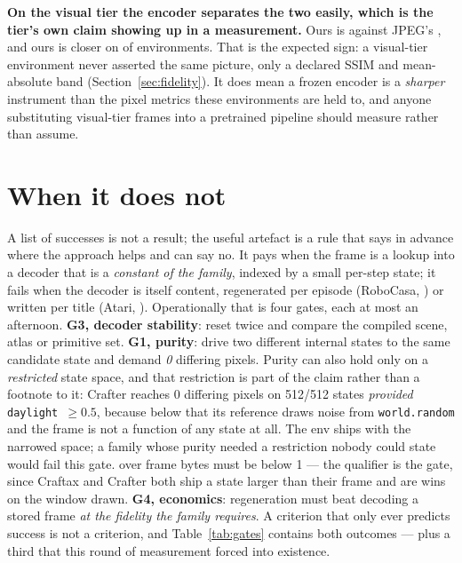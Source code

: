 \documentclass{article}
\begin{document}
\textbf{On the visual tier the encoder separates the two easily, which is the
tier's own claim showing up in a measurement.} Ours is \seDinoVisualOurs{}
against JPEG's \seDinoVisualJpeg{}, and ours is closer on
\seDinoVisualCloser{} of \seDinoVisualN{} environments. That is the expected
sign: a visual-tier environment never asserted the same picture, only a
declared SSIM and mean-absolute band (Section~\ref{sec:fidelity}). It does mean
a frozen encoder is a \emph{sharper} instrument than the pixel metrics these
environments are held to, and anyone substituting visual-tier frames into a
pretrained pipeline should measure rather than assume.


\section{When it does not}
\label{sec:nogo}

A list of successes is not a result; the useful artefact is a rule that says in
advance where the approach helps and can say no. It pays when the frame is a
lookup into a decoder that is a \emph{constant of the family}, indexed by a
small per-step state; it fails when the decoder is itself content, regenerated
per episode (RoboCasa, \citealt{robocasa}) or written per title (Atari,
\citealt{ale}). Operationally that is four gates, each at most an afternoon. \textbf{G3, decoder stability}: reset twice and compare the compiled
scene, atlas or primitive set. \textbf{G1, purity}: drive two different
internal states to the same candidate state and demand \emph{0} differing
pixels. Purity can also hold only on a \emph{restricted} state space, and that
restriction is part of the claim rather than a footnote to it: Crafter reaches 0
differing pixels on 512/512 states \emph{provided} \texttt{daylight}~$\ge 0.5$,
because below that its reference draws noise from \texttt{world.random} and the
frame is not a function of any state at all. The env ships with the narrowed
space; a family whose purity needed a restriction nobody could state would fail
this gate.
over frame bytes must be below 1 --- the qualifier is the gate, since Craftax
and Crafter both ship a state larger than their frame and are wins on the
window drawn. \textbf{G4, economics}: regeneration must beat decoding a stored
frame \emph{at the fidelity the family requires}. A criterion that only ever
predicts success is not a criterion, and Table~\ref{tab:gates} contains both
outcomes --- plus a third that this round of measurement forced into existence.
\end{document}
